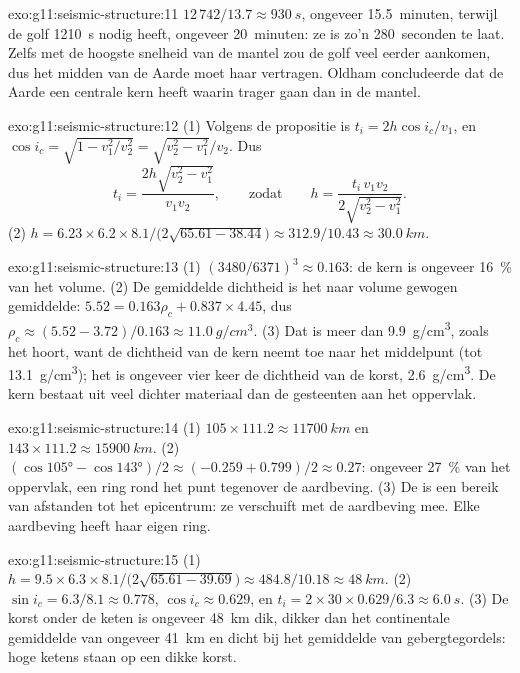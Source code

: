 \begin{solution}{exo:g11:seismic-structure:11}
$12\,742/13.7 \approx \qty{930}{s}$, ongeveer 15.5~minuten, terwijl de golf
\qty{1210}{s} nodig heeft, ongeveer 20~minuten: ze is zo'n 280~seconden te laat.
Zelfs met de hoogste snelheid van de mantel zou de golf veel eerder aankomen, dus
het midden van de Aarde moet haar vertragen. Oldham concludeerde dat de Aarde een
centrale kern heeft waarin  trager gaan dan in de mantel.
\end{solution}

\begin{solution}{exo:g11:seismic-structure:12}
(1) Volgens de propositie is $t_i = 2h\cos i_c/v_1$, en $\cos i_c = \sqrt{1 -
v_1^2/v_2^2} = \sqrt{v_2^2 - v_1^2}/v_2$. Dus
\[
  t_i = \frac{2h\sqrt{v_2^2 - v_1^2}}{v_1 v_2},
  \qquad\text{zodat}\qquad
  h = \frac{t_i\,v_1 v_2}{2\sqrt{v_2^2 - v_1^2}}.
\]
(2) $h = 6.23 \times 6.2 \times 8.1/\bigl(2\sqrt{65.61 -
38.44}\bigr) \approx 312.9/10.43 \approx \qty{30.0}{km}$.
\end{solution}

\begin{solution}{exo:g11:seismic-structure:13}
(1) $(3480/6371)^3 \approx 0.163$: de kern is ongeveer \qty{16}{\percent} van
het volume. (2) De gemiddelde dichtheid is het naar volume gewogen gemiddelde:
$5.52 = 0.163
\rho_c + 0.837 \times 4.45$, dus $\rho_c \approx (5.52 - 3.72)/0.163 \approx
\qty{11.0}{g/cm^3}$. (3) Dat is meer dan \qty{9.9}{g/cm^3}, zoals het hoort,
want de dichtheid van de kern neemt toe naar het middelpunt (tot
\qty{13.1}{g/cm^3}); het is ongeveer vier keer de dichtheid van de korst,
\qty{2.6}{g/cm^3}. De kern bestaat uit veel dichter materiaal dan de gesteenten
aan het oppervlak.
\end{solution}

\begin{solution}{exo:g11:seismic-structure:14}
(1) $105 \times 111.2 \approx \qty{11700}{km}$ en $143 \times 111.2 \approx
\qty{15900}{km}$. (2) $(\cos\ang{105} - \cos\ang{143})/2 \approx (-0.259 +
0.799)/2 \approx 0.27$: ongeveer \qty{27}{\percent} van het oppervlak, een ring
rond het punt tegenover de aardbeving. (3) De  is een bereik van
afstanden tot het epicentrum: ze verschuift met de aardbeving mee. Elke aardbeving
heeft haar eigen ring.
\end{solution}

\begin{solution}{exo:g11:seismic-structure:15}
(1) $h = 9.5 \times 6.3 \times 8.1/\bigl(2\sqrt{65.61 - 39.69}\bigr) \approx
484.8/10.18 \approx \qty{48}{km}$. (2) $\sin i_c = 6.3/8.1 \approx 0.778$,
$\cos i_c \approx 0.629$, en $t_i = 2 \times 30 \times 0.629/6.3 \approx
\qty{6.0}{s}$. (3) De korst onder de keten is ongeveer \qty{48}{km} dik, dikker
dan het continentale gemiddelde van ongeveer \qty{41}{km} en dicht bij het
gemiddelde van gebergtegordels: hoge ketens staan op een dikke korst.
\end{solution}

